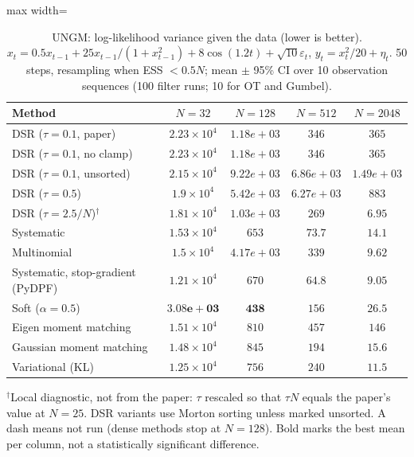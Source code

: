 \begin{table}[H]
\centering
\small
\caption{UNGM: log-likelihood variance given the data (lower is better). $x_t=0.5x_{t-1}+25x_{t-1}/(1+x_{t-1}^2)+8\cos(1.2t)+\sqrt{10}\varepsilon_t$, $y_t=x_t^2/20+\eta_t$. 50 steps, resampling when ESS $<0.5N$; mean $\pm$ 95\% CI over 10 observation sequences (100 filter runs; 10 for OT and Gumbel).}
\label{tab:ungm-conditional_loglik_variance}
\begin{adjustbox}{max width=\linewidth}
\begin{tabular}{lcccc}
\toprule
Method & $N{=}32$ & $N{=}128$ & $N{=}512$ & $N{=}2048$ \\
\midrule
DSR ($\tau{=}0.1$, paper) & $2.23\times10^{4}$ & $1.18e+03$ & $346$ & $365$ \\
DSR ($\tau{=}0.1$, no clamp) & $2.23\times10^{4}$ & $1.18e+03$ & $346$ & $365$ \\
DSR ($\tau{=}0.1$, unsorted) & $2.15\times10^{4}$ & $9.22e+03$ & $6.86e+03$ & $1.49e+03$ \\
DSR ($\tau{=}0.5$) & $1.9\times10^{4}$ & $5.42e+03$ & $6.27e+03$ & $883$ \\
DSR ($\tau{=}2.5/N$)$^\dagger$ & $1.81\times10^{4}$ & $1.03e+03$ & $269$ & $\mathbf{6.95}$ \\
\midrule
Systematic & $1.53\times10^{4}$ & $653$ & $73.7$ & $14.1$ \\
Multinomial & $1.5\times10^{4}$ & $4.17e+03$ & $339$ & $9.62$ \\
Systematic, stop-gradient (PyDPF) & $1.21\times10^{4}$ & $670$ & $\mathbf{64.8}$ & $9.05$ \\
Soft ($\alpha{=}0.5$) & $\mathbf{3.08e+03}$ & $\mathbf{438}$ & $156$ & $26.5$ \\
Eigen moment matching & $1.51\times10^{4}$ & $810$ & $457$ & $146$ \\
Gaussian moment matching & $1.48\times10^{4}$ & $845$ & $194$ & $15.6$ \\
Variational (KL) & $1.25\times10^{4}$ & $756$ & $240$ & $11.5$ \\
\bottomrule
\end{tabular}
\end{adjustbox}
\par\smallskip\parbox{0.95\linewidth}{\footnotesize $^\dagger$Local diagnostic, not from the paper: $\tau$ rescaled so that $\tau N$ equals the paper's value at $N{=}25$. DSR variants use Morton sorting unless marked unsorted. A dash means not run (dense methods stop at $N{=}128$). Bold marks the best mean per column, not a statistically significant difference.}
\end{table}

